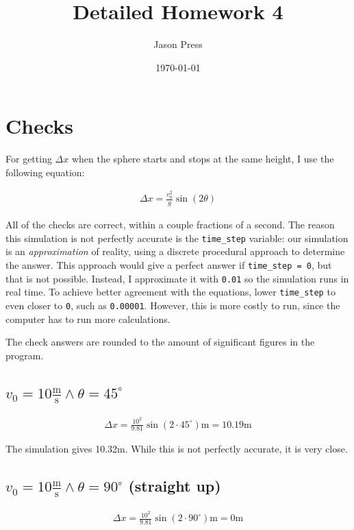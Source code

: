 \documentclass[12pt]{article}
\author{Jason Press}
\date{\today}
\title{Detailed Homework 4}
\begin{document}
\maketitle
\section{Checks}
\label{sec:org43fcb29}

For getting \(\Delta x\) when the sphere starts and stops at the same height, I use the following equation:

\begin{align}
\Delta x = \frac{ v_0^2 }{g}\sin(2\theta)
\end{align}

All of the checks are correct, within a couple fractions of a second. The reason this simulation is not perfectly accurate is the \texttt{time\_step} variable: our simulation is an \emph{approximation} of reality, using a discrete procedural approach to determine the answer. This approach would give a perfect answer if \texttt{time\_step = 0}, but that is not possible. Instead, I approximate it with \texttt{0.01} so the simulation runs in real time. To achieve better agreement with the equations, lower \texttt{time\_step} to even closer to \texttt{0}, such as \texttt{0.00001}. However, this is more costly to run, since the computer has to run more calculations.

The check answers are rounded to the amount of significant figures in the program.
\subsection{\(v_0 = 10 \frac{\text{m}}{\text{s}} \land \theta = 45 ^{\circ}\)}
\label{sec:org1e7fb78}

\begin{align*}
\Delta x = \frac{10^2}{9.81}\sin(2 \cdot 45^{\circ}) \text{m} = 10.19 \text{m}
\end{align*}

The simulation gives 10.32m. While this is not perfectly accurate, it is very close.
\subsection{\(v_0 = 10 \frac{\text{m}}{\text{s}} \land \theta = 90 ^{\circ}\) (straight up)}
\label{sec:orga9787a7}

\begin{align*}
\Delta x = \frac{10^2}{9.81}\sin(2 \cdot 90^{\circ}) \text{m} = 0 \text{m}
\end{align*}
\end{document}
